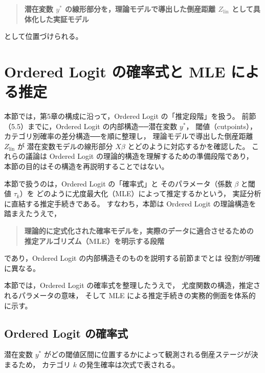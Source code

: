 \begin{quote}
\textbf{潜在変数 $y^*$ の線形部分を，理論モデルで導出した倒産距離 $Z_{\text{lin}}$ として具体化した実証モデル}
\end{quote}

として位置づけられる。



\section{Ordered Logit の確率式と MLE による推定}
\label{sec:ordered_logit_mle}

本節では，第5章の構成に沿って，Ordered Logit の「推定段階」を扱う。
前節（5.5）までに，Ordered Logit の内部構造──潜在変数 $y^*$，
閾値（cutpoints），カテゴリ別確率の差分構造──を順に整理し，
理論モデルで導出した倒産距離 $Z_{\text{lin}}$ が
潜在変数モデルの線形部分 $X\beta$ とどのように対応するかを確認した。
これらの議論は Ordered Logit の理論的構造を理解するための準備段階であり，
本節の目的はその構造を再説明することではない。

本節で扱うのは，Ordered Logit の「確率式」と
そのパラメータ（係数 $\beta$ と閾値 $\tau_k$）を
どのように尤度最大化（MLE）によって推定するかという，
実証分析に直結する推定手続きである。
すなわち，本節は Ordered Logit の理論構造を踏まえたうえで，

\begin{quote}
\textbf{理論的に定式化された確率モデルを，実際のデータに適合させるための  
推定アルゴリズム（MLE）を明示する段階}
\end{quote}

であり，Ordered Logit の内部構造そのものを説明する前節までとは
役割が明確に異なる。

本節では，Ordered Logit の確率式を整理したうえで，
尤度関数の構造，推定されるパラメータの意味，
そして MLE による推定手続きの実務的側面を体系的に示す。


\subsection{Ordered Logit の確率式}

潜在変数 $y^*$ がどの閾値区間に位置するかによって観測される倒産ステージが決まるため，
カテゴリ $k$ の発生確率は次式で表される。

